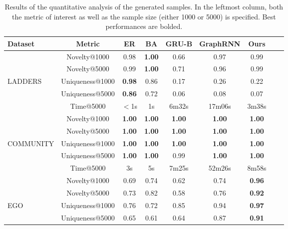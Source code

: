 \begin{table}[h!]
    \footnotesize
    \centering
    \caption{Results of the quantitative analysis of the generated samples. In the leftmost column, both the metric of interest as well as the sample size (either 1000 or 5000) is specified. Best performances are bolded.}
    \label{tab:graph-quantitative}
    \renewcommand{\arraystretch}{1.2}
    \begin{tabular}{lcccccccc}
        \toprule
         \textbf{Dataset} & \textbf{Metric} & \textbf{ER} & \textbf{BA} & \textbf{GRU-B} & \textbf{GraphRNN} & \textbf{Ours} \\
         \midrule
          & Novelty@1000              & 0.98  & \textbf{1.00} & 0.66  & 0.97   & 0.99\\
          & Novelty@5000              & 0.99  & \textbf{1.00} & 0.71  & 0.96   & 0.99\\
          LADDERS & Uniqueness@1000   & \textbf{0.98}  & 0.86 & 0.17  & 0.26   & 0.22\\
          & Uniqueness@5000           & \textbf{0.86}  & 0.72 & 0.06  & 0.08   & 0.07\\
          & Time@5000                 & $<$1s & 1s   & 6m32s & 17m06s & 3m38s\\
         \midrule
          & Novelty@1000              & \textbf{1.00} & \textbf{1.00} & \textbf{1.00}  & \textbf{1.00}   & \textbf{1.00}\\
          & Novelty@5000              & \textbf{1.00} & \textbf{1.00} & \textbf{1.00}  & \textbf{1.00}   & \textbf{1.00}\\
          COMMUNITY & Uniqueness@1000 & \textbf{1.00} & \textbf{1.00} & \textbf{1.00}  & \textbf{1.00}   & \textbf{1.00}\\
          & Uniqueness@5000           & \textbf{1.00} & \textbf{1.00} & 0.99  & \textbf{1.00}   & \textbf{1.00}\\
          & Time@5000                 & 3s   & 5s   & 7m25s & 52m26s & 8m58s\\
         \midrule
          & Novelty@1000              & 0.69 & 0.74 & 0.62  & 0.74     & \textbf{0.96}\\
          & Novelty@5000              & 0.73 & 0.82 & 0.58  & 0.76     & \textbf{0.92}\\
          EGO & Uniqueness@1000       & 0.76 & 0.72 & 0.85  & 0.94     & \textbf{0.97}\\
          & Uniqueness@5000           & 0.65 & 0.61 & 0.64  & 0.87     & \textbf{0.91}\\

\end{tabular}
\end{table}
